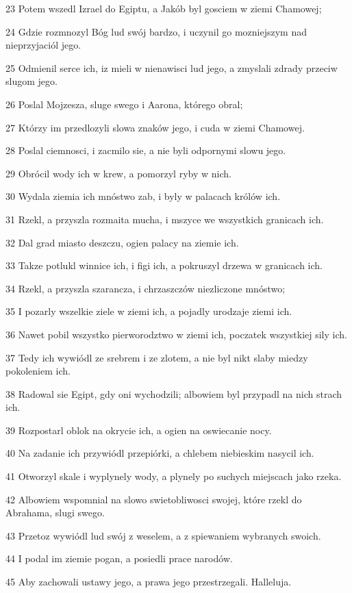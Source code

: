 \par 23 Potem wszedl Izrael do Egiptu, a Jakób byl gosciem w ziemi Chamowej;
\par 24 Gdzie rozmnozyl Bóg lud swój bardzo, i uczynil go mozniejszym nad nieprzyjaciól jego.
\par 25 Odmienil serce ich, iz mieli w nienawisci lud jego, a zmyslali zdrady przeciw slugom jego.
\par 26 Poslal Mojzesza, sluge swego i Aarona, którego obral;
\par 27 Którzy im przedlozyli slowa znaków jego, i cuda w ziemi Chamowej.
\par 28 Poslal ciemnosci, i zacmilo sie, a nie byli odpornymi slowu jego.
\par 29 Obrócil wody ich w krew, a pomorzyl ryby w nich.
\par 30 Wydala ziemia ich mnóstwo zab, i byly w palacach królów ich.
\par 31 Rzekl, a przyszla rozmaita mucha, i mszyce we wszystkich granicach ich.
\par 32 Dal grad miasto deszczu, ogien palacy na ziemie ich.
\par 33 Takze potlukl winnice ich, i figi ich, a pokruszyl drzewa w granicach ich.
\par 34 Rzekl, a przyszla szarancza, i chrzaszczów niezliczone mnóstwo;
\par 35 I pozarly wszelkie ziele w ziemi ich, a pojadly urodzaje ziemi ich.
\par 36 Nawet pobil wszystko pierworodztwo w ziemi ich, poczatek wszystkiej sily ich.
\par 37 Tedy ich wywiódl ze srebrem i ze zlotem, a nie byl nikt slaby miedzy pokoleniem ich.
\par 38 Radowal sie Egipt, gdy oni wychodzili; albowiem byl przypadl na nich strach ich.
\par 39 Rozpostarl oblok na okrycie ich, a ogien na oswiecanie nocy.
\par 40 Na zadanie ich przywiódl przepiórki, a chlebem niebieskim nasycil ich.
\par 41 Otworzyl skale i wyplynely wody, a plynely po suchych miejscach jako rzeka.
\par 42 Albowiem wspomnial na slowo swietobliwosci swojej, które rzekl do Abrahama, slugi swego.
\par 43 Przetoz wywiódl lud swój z weselem, a z spiewaniem wybranych swoich.
\par 44 I podal im ziemie pogan, a posiedli prace narodów.
\par 45 Aby zachowali ustawy jego, a prawa jego przestrzegali. Halleluja.

